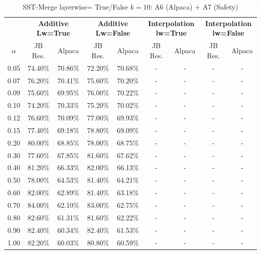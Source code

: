 \begin{table}[h]
\centering
\caption{SST-Merge layerwise= True/False $k=10$: A6 (Alpaca) + A7 (Safety)}
\label{tab:res_a6_sst_merge_10}
\begin{tabular}{c|cc|cc|cc|cc}
\hline
 & \multicolumn{2}{c|}{\textbf{Additive Lw=True}} & \multicolumn{2}{c|}{\textbf{Additive Lw=False}} & \multicolumn{2}{c|}{\textbf{Interpolation lw=True}}& \multicolumn{2}{c}{\textbf{Interpolation lw=False}} \\
$\alpha$ & JB Res. & Alpaca & JB Res. & Alpaca & JB Res. & Alpaca & JB Res. & Alpaca \\
\hline
0.05 & 74.40\% & 70.86\% & 72.20\% & 70.68\% & - & - & - & - \\
0.07 & 76.20\% & 70.41\% & 75.60\% & 70.20\% & - & - & - & - \\
0.09 & 75.60\% & 69.95\% & 76.00\% & 70.22\% & - & - & - & - \\
0.10 & 74.20\% & 70.33\% & 75.20\% & 70.02\% & - & - & - & - \\
0.12 & 76.60\% & 70.09\% & 77.00\% & 69.93\% & - & - & - & - \\
0.15 & 77.40\% & 69.18\% & 78.80\% & 69.09\% & - & - & - & - \\
0.20 & 80.00\% & 68.85\% & 78.00\% & 68.75\% & - & - & - & - \\
0.30 & 77.60\% & 67.85\% & 81.60\% & 67.62\% & - & - & - & - \\
0.40 & 81.20\% & 66.33\% & 82.00\% & 66.13\% & - & - & - & - \\
0.50 & 78.00\% & 64.53\% & 81.40\% & 64.21\% & - & - & - & - \\
0.60 & 82.00\% & 62.89\% & 81.40\% & 63.18\% & - & - & - & - \\
0.70 & 84.00\% & 62.10\% & 83.00\% & 62.75\% & - & - & - & - \\
0.80 & 82.60\% & 61.31\% & 81.60\% & 62.22\% & - & - & - & - \\
0.90 & 82.40\% & 60.34\% & 82.40\% & 61.53\% & - & - & - & - \\
1.00 & 82.20\% & 60.03\% & 80.80\% & 60.59\% & - & - & - & - \\
\hline
\end{tabular}
\end{table}
\FloatBarrier

